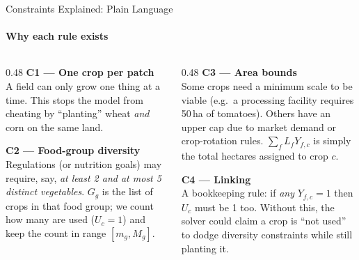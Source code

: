 \documentclass[aspectratio=169,10pt]{beamer}
\begin{document}
\begin{frame}{Constraints Explained: Plain Language}
    \framesubtitle{Why each rule exists}

    \begin{columns}[T]
        \begin{column}{0.48\textwidth}
            \textbf{\textcolor{primaryBlue}{C1 --- One crop per patch}}\\[4pt]
            A field can only grow one thing at a time.
            This stops the model from cheating by
            ``planting'' wheat \emph{and} corn on the same land.

            \vspace{0.5cm}
            \textbf{\textcolor{accentTeal}{C2 --- Food-group diversity}}\\[4pt]
            Regulations (or nutrition goals) may require, say,
            \emph{at least 2 and at most 5 distinct vegetables}.
            $G_g$ is the list of crops in that food group;
            we count how many are used ($U_c=1$) and keep
            the count in range $[m_g, M_g]$.
        \end{column}
        \begin{column}{0.48\textwidth}
            \textbf{\textcolor{accentGreen}{C3 --- Area bounds}}\\[4pt]
            Some crops need a minimum scale to be viable
            (e.g.\ a processing facility requires 50\,ha of tomatoes).
            Others have an upper cap due to market demand or
            crop-rotation rules. $\sum_f L_f Y_{f,c}$ is simply the
            total hectares assigned to crop $c$.

            \vspace{0.5cm}
            \textbf{\textcolor{warmOrange}{C4 --- Linking}}\\[4pt]
            A bookkeeping rule: if \emph{any} $Y_{f,c}=1$ then
            $U_c$ must be 1 too. Without this, the solver could
            claim a crop is ``not used'' to dodge diversity
            constraints while still planting it.
        \end{column}
    \end{columns}
\end{frame}
\end{document}
